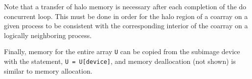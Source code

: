 Note that a transfer of halo memory is necessary after each completion of the do concurrent loop.
This must be done in order for the halo region of a coarray on a given process to be consistent
with the corresponding interior of the coarray on a logically neighboring process.


Finally, memory for the entire array \texttt{U} can be copied from the
subimage device with the statement,
\texttt{U = U[device]}, 
and memory deallocation (not shown) is similar to memory allocation.












